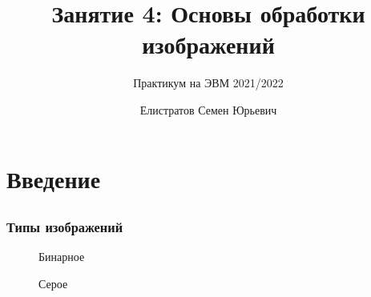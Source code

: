 \documentclass[fleqn, xcolor=x11names]{beamer}
\title[Введение в Python]{\bfseries Занятие 4: Основы обработки изображений}
\author[Елистратов~С.\,Ю.]{Елистратов Семен Юрьевич}
\subtitle{Практикум на ЭВМ 2021/2022}
\institute[ВМК МГУ]{МГУ имени М. В. Ломоносова, факультет ВМК, кафедра ММП}
\date{}
\begin{document}
\begin{frame}
\maketitle
\end{frame}

\section{Введение}
\subsection*{}

\begin{frame}[fragile]\frametitle{Типы изображений}
	
		\begin{figure}[H]
		\begin{minipage}[h]{0.25\linewidth}
			 Бинарное \\
		\end{minipage}
		\hfill
		\begin{minipage}[h]{0.25\linewidth}
			 Серое\\

\end{minipage}
\end{figure}
\end{frame}
\end{document}
